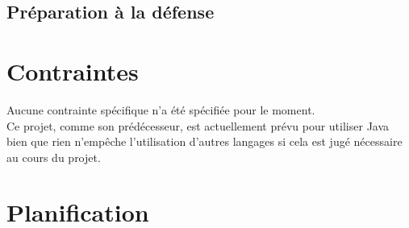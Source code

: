 \documentclass{article}
\begin{document}
  \subsection{Préparation à la défense}

\section{Contraintes}
  Aucune contrainte spécifique n'a été spécifiée pour le moment.\\
  Ce projet, comme son prédécesseur, est actuellement prévu pour utiliser Java bien que rien n'empêche l'utilisation d'autres langages si cela est jugé nécessaire au cours du projet.

\newpage
\section{Planification}
\end{document}
